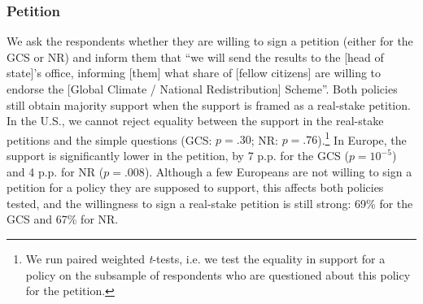 \begin{table}[h]
  \caption[List experiment: tacit support for the GCS]{Number of supported policies in the list experiment depending on the presence of the Global Climate Scheme (GCS) in the list.%
  }\label{tab:list_exp}
  \makebox[\textwidth][c]{
  }
\end{table}

\subsubsection{Petition}\label{subsubsec:petition} %
We ask the respondents whether they are willing to sign a petition (either for the GCS or NR) and inform them that ``we will send the results to the [head of state]'s office, informing [them] what share of [fellow citizens] are willing to endorse the [Global Climate / National Redistribution] Scheme''. Both policies still obtain majority support when the support is framed as a real-stake petition. In the U.S., we cannot reject equality between the support in the real-stake petitions and the simple questions (GCS: $p=.30$; NR: $p=.76$).\footnote{We run paired weighted \textit{t}-tests, i.e. we test the equality in support for a policy on the subsample of respondents who are questioned about this policy for the petition.} In Europe, the support is significantly lower in the petition, by 7 p.p. for the GCS ($p=10^{-5}$) and 4 p.p. for NR ($p=.008$). Although a few Europeans are not willing to sign a petition for a policy they are supposed to support, this affects both policies tested, and the willingness to sign a real-stake petition is still strong: 69\% for the GCS and 67\% for NR.

